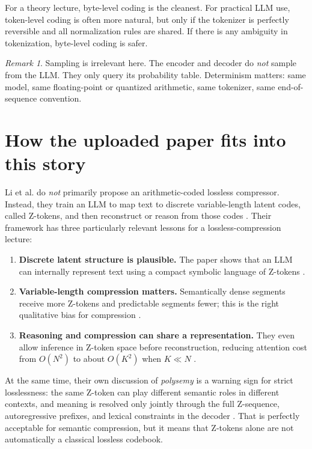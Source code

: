 \documentclass[11pt]{article}
\theoremstyle{remark}
\newtheorem*{remark}{Remark}
\begin{document}
For a theory lecture, byte-level coding is the cleanest. For practical LLM use, token-level coding is often more natural, but only if the tokenizer is perfectly reversible and all normalization rules are shared. If there is any ambiguity in tokenization, byte-level coding is safer.

\begin{remark}
Sampling is irrelevant here. The encoder and decoder do \emph{not} sample from the LLM. They only query its probability table. Determinism matters: same model, same floating-point or quantized arithmetic, same tokenizer, same end-of-sequence convention.
\end{remark}

\section{How the uploaded paper fits into this story}

Li et al. do \emph{not} primarily propose an arithmetic-coded lossless compressor. Instead, they train an LLM to map text to discrete variable-length latent codes, called Z-tokens, and then reconstruct or reason from those codes \cite{li2026}. Their framework has three particularly relevant lessons for a lossless-compression lecture:

\begin{enumerate}
    \item \textbf{Discrete latent structure is plausible.} The paper shows that an LLM can internally represent text using a compact symbolic language of Z-tokens \cite{li2026}.
    \item \textbf{Variable-length compression matters.} Semantically dense segments receive more Z-tokens and predictable segments fewer; this is the right qualitative bias for compression \cite{li2026}.
    \item \textbf{Reasoning and compression can share a representation.} They even allow inference in Z-token space before reconstruction, reducing attention cost from $O(N^2)$ to about $O(K^2)$ when $K \ll N$ \cite{li2026}.
\end{enumerate}

At the same time, their own discussion of \emph{polysemy} is a warning sign for strict losslessness: the same Z-token can play different semantic roles in different contexts, and meaning is resolved only jointly through the full Z-sequence, autoregressive prefixes, and lexical constraints in the decoder \cite{li2026}. That is perfectly acceptable for semantic compression, but it means that Z-tokens alone are not automatically a classical lossless codebook.
\end{document}
